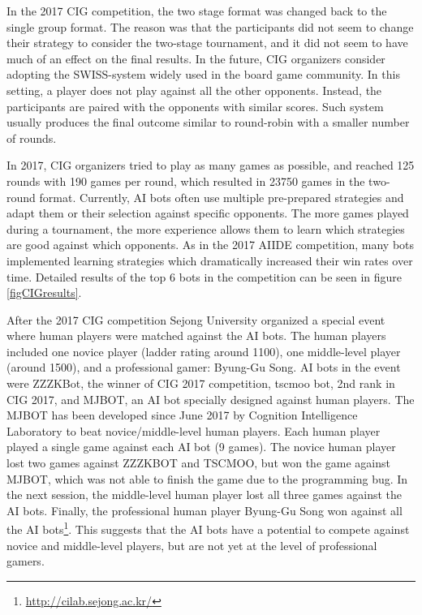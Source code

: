 In the 2017 CIG competition, the two stage format was changed back to the single group format. The reason was that the participants did not seem to change their strategy to consider the two-stage tournament, and it did not seem to have much of an effect on the final results. In the future, CIG organizers consider adopting the SWISS-system widely used in the board game community. In this setting, a player does not play against all the other opponents. Instead, the participants are paired with the opponents with similar scores. Such system usually produces the final outcome similar to round-robin with a smaller number of rounds. 

In 2017, CIG organizers tried to play as many games as possible, and reached 125 rounds with 190 games per round, which resulted in 23750 games in the two-round format. Currently, AI bots often use multiple pre-prepared strategies and adapt them or their selection against specific opponents. The more games played during a tournament, the more experience allows them to learn which strategies are good against which opponents. As in the 2017 AIIDE competition, many bots implemented learning strategies which dramatically increased their win rates over time. Detailed results of the top 6 bots in the competition can be seen in figure \ref{figCIGresults}.

After the 2017 CIG competition Sejong University organized a special event where human players were matched against the AI bots. The human players included one novice player (ladder rating around 1100), one middle-level player (around 1500), and a professional gamer: Byung-Gu Song. AI bots in the event were ZZZKBot, the winner of CIG 2017 competition, tscmoo bot, 2nd rank in CIG 2017, and MJBOT, an AI bot specially designed against human players. The MJBOT has been developed since June 2017 by Cognition Intelligence Laboratory to beat novice/middle-level human players. Each human player played a single game against each AI bot (9 games). The novice human player lost two games against ZZZKBOT and TSCMOO, but won the game against MJBOT, which was not able to finish the game due to the programming bug. In the next session, the middle-level human player lost all three games against the AI bots. Finally, the professional human player Byung-Gu Song won against all the AI bots\footnote{\url{http://cilab.sejong.ac.kr/}}. This suggests that the AI bots have a potential to compete against novice and middle-level players, but are not yet at the level of professional gamers. 

